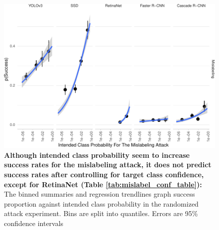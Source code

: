 \begin{figure}[tb]

{\centering \includegraphics{imgs/mislabel_conf_graph-1} 

}

\caption{\textbf{Although intended class probability seem to increase success rates for the mislabeling attack, it does not predict success rates after controlling for target class confidence, except for RetinaNet (Table \ref{tab:mislabel_conf_table}):}  The binned summaries and regression trendlines graph success proportion against intended class probability in the randomized attack experiment. Bins are split into quantiles. Errors are 95\% confidence intervals}\label{fig:mislabel_conf_graph}
\end{figure}

\begingroup\fontsize{9}{11}\selectfont

